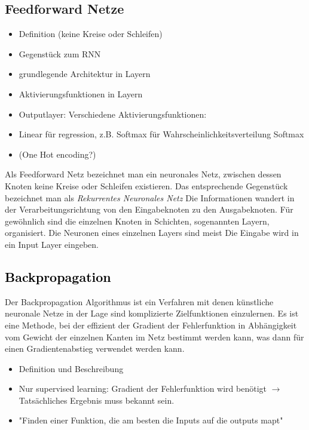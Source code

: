 \color{black}

\subsection{Feedforward Netze}

\begin{itemize}
	\item Definition (keine Kreise oder Schleifen)
	\item Gegenstück zum RNN
	\item grundlegende Architektur in Layern 
	\item Aktivierungsfunktionen in Layern
	\item Outputlayer: Verschiedene Aktivierungsfunktionen:
	\item Linear für regression, z.B. Softmax für Wahrscheinlichkeitsverteilung Softmax
	\item (One Hot encoding?)
\end{itemize}

\color{blue}

Als Feedforward Netz bezeichnet man ein neuronales Netz, zwischen dessen Knoten keine Kreise oder Schleifen existieren.
Das entsprechende Gegenstück bezeichnet man als \textit{Rekurrentes Neuronales Netz}
Die Informationen wandert in der Verarbeitungsrichtung von den Eingabeknoten zu den Ausgabeknoten.
Für gewöhnlich sind die einzelnen Knoten in Schichten, sogenannten Layern, organisiert.
Die Neuronen eines einzelnen Layers sind meist 
Die Eingabe wird in ein Input Layer eingeben.

\subsection{\textcolor{black}{Backpropagation}}

Der Backpropagation Algorithmus ist ein Verfahren mit denen künstliche neuronale Netze in der Lage sind komplizierte Zielfunktionen einzulernen.
Es ist eine Methode, bei der effizient der Gradient der Fehlerfunktion in Abhängigkeit vom Gewicht der einzelnen Kanten im Netz bestimmt werden kann,
was dann für einen Gradientenabstieg verwendet werden kann. 

\color{black}
\begin{itemize}
	\item Definition und Beschreibung
	\item Nur supervised learning: Gradient der Fehlerfunktion wird benötigt \(\rightarrow\) Tatsächliches Ergebnis muss bekannt sein.
	\item "Finden einer Funktion, die am besten die Inputs auf die outputs mapt"
\end{itemize}

